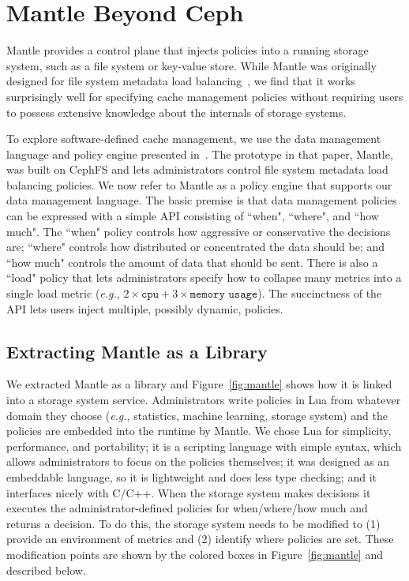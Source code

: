 \chapter{Mantle Beyond Ceph}
\label{chp:mantle1}

Mantle provides a control plane that injects policies into a running
storage system, such as a file system or key-value store. While Mantle was
originally designed for file system metadata load
balancing~\cite{sevilla:sc15-mantle}, we find that it works surprisingly well
for specifying cache management policies without requiring users to possess
extensive knowledge about the internals of storage systems. 

To explore software-defined cache management, we use the data management
language and policy engine presented in~\cite{sevilla:sc15-mantle}. The
prototype in that paper, Mantle, was built on CephFS and lets administrators
control file system metadata load balancing policies.  We now refer to Mantle
as a policy engine that supports our data management language.  The basic
premise is that data management policies can be expressed with a simple API
consisting of ``when", ``where", and ``how much". The ``when" policy controls
how aggressive or conservative the decisions are; ``where" controls how
distributed or concentrated the data should be; and ``how much" controls the
amount of data that should be sent. There is also a ``load" policy that lets
administrators specify how to collapse many metrics into a single load metric
({\it e.g.}, \(2\times\texttt{cpu} + 3\times\texttt{memory usage}\)).
The succinctness of the API lets users inject multiple, possibly dynamic, policies. 

\section{Extracting Mantle as a Library}
\label{sec:extracting}

We extracted Mantle as a library and Figure~\ref{fig:mantle} shows how it is
linked into a storage system service.  Administrators write policies in Lua from whatever
domain they choose ({\it e.g.}, statistics, machine learning, storage system)
and the policies are embedded into the runtime by Mantle.  We chose Lua for
simplicity, performance, and portability; it is a scripting language with
simple syntax, which allows administrators to focus on the policies themselves;
it was designed as an embeddable language, so it is lightweight and does less
type checking; and it interfaces nicely with C/C++.  When the storage system makes
decisions it executes the administrator-defined policies for when/where/how
much and returns a decision.  To do this, the storage system needs to be modified to
(1) provide an environment of metrics and (2) identify where policies are set.
These modification points are shown by the colored boxes in
Figure~\ref{fig:mantle} and described below.

